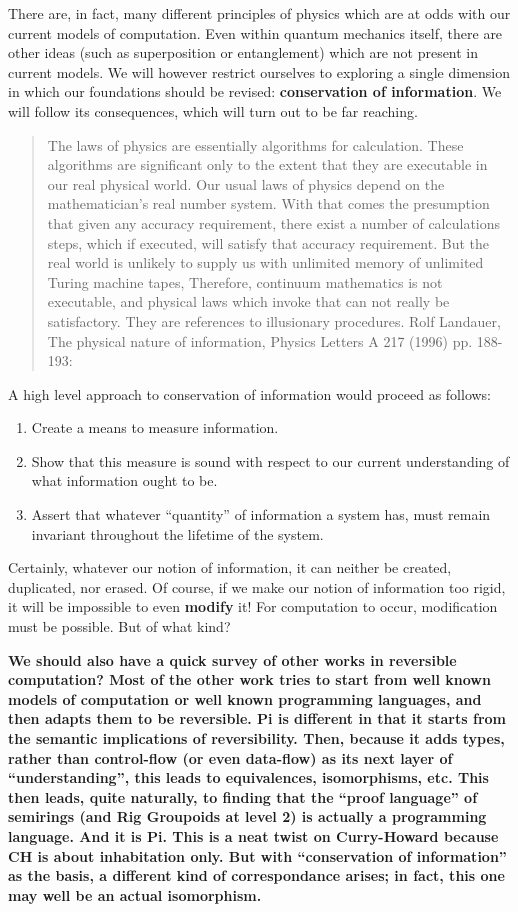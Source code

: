 \documentclass{article}
\newcommand{\amr}[1]{\fbox{Amr says:} \textbf{#1}}
\begin{document}
There are, in fact, many different principles of physics which are
at odds with our current models of computation. Even within quantum
mechanics itself, there are other ideas (such as superposition or
entanglement) which are not present in current models. We will however
restrict ourselves to exploring a single dimension in which our
foundations should be revised: \textbf{conservation of information}.
We will follow its consequences, which will turn out to be far reaching.

\begin{quote}
  The laws of physics are essentially algorithms for calculation. These
  algorithms are significant only to the extent that they are executable in
  our real physical world. Our usual laws of physics depend on the
  mathematician's real number system. With that comes the presumption that
  given any accuracy requirement, there exist a number of calculations steps,
  which if executed, will satisfy that accuracy requirement. But the real
  world is unlikely to supply us with unlimited memory of unlimited Turing
  machine tapes, Therefore, continuum mathematics is not executable, and
  physical laws which invoke that can not really be satisfactory. They are
  references to illusionary procedures. Rolf Landauer, The physical nature of
  information, Physics Letters A 217 (1996) pp. 188-193:
\end{quote}

A high level approach to conservation of information would proceed
as follows:
\begin{enumerate}
\item Create a means to measure information.
\item Show that this measure is sound with respect to our current understanding
of what information ought to be.
\item Assert that whatever ``quantity'' of information a system has, must
remain invariant throughout the lifetime of the system.
\end{enumerate}

Certainly, whatever our notion of information, it can neither be created,
duplicated, nor erased. Of course, if we make our notion of information
too rigid, it will be impossible to even \textbf{modify} it! For computation
to occur, modification must be possible.  But of what kind?

\amr{We should also have a quick survey of other works in reversible
computation? Most of the other work tries to start from well known
models of computation or well known programming languages, and then
adapts them to be reversible. Pi is different in that it starts from
the semantic implications of reversibility. Then, because it adds
types, rather than control-flow (or even data-flow) as its next layer
of ``understanding'', this leads to equivalences, isomorphisms, etc.
This then leads, quite naturally, to finding that the ``proof
language'' of semirings (and Rig Groupoids at level 2) is actually a
programming language. And it is Pi. This is a neat twist on
Curry-Howard because CH is about \textbf{inhabitation} only. But with
``conservation of information'' as the basis, a different kind of
correspondance arises; in fact, this one may well be an actual
isomorphism.}
\end{document}
